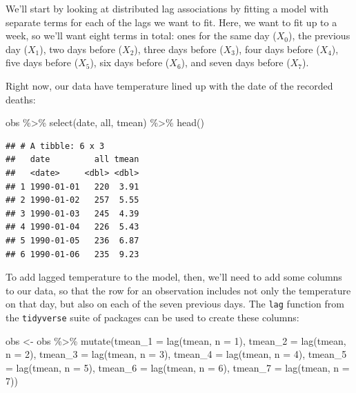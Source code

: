 \documentclass[
]{book}
\newenvironment{Shaded}{\begin{snugshade}}{\end{snugshade}}
\newcommand{\AttributeTok}[1]{\textcolor[rgb]{0.77,0.63,0.00}{#1}}
\newcommand{\DecValTok}[1]{\textcolor[rgb]{0.00,0.00,0.81}{#1}}
\newcommand{\FunctionTok}[1]{\textcolor[rgb]{0.00,0.00,0.00}{#1}}
\newcommand{\NormalTok}[1]{#1}
\newcommand{\OtherTok}[1]{\textcolor[rgb]{0.56,0.35,0.01}{#1}}
\newcommand{\SpecialCharTok}[1]{\textcolor[rgb]{0.00,0.00,0.00}{#1}}
\begin{document}
We'll start by looking at distributed lag associations by fitting a model with
separate terms for each of the lags we want to fit. Here, we want to fit up to
a week, so we'll want eight terms in total: ones for the same day (\(X_0\)), the
previous day (\(X_1\)), two days before (\(X_2\)), three days before (\(X_3\)),
four days before (\(X_4\)), five days before (\(X_5\)), six days before (\(X_6\)),
and seven days before (\(X_7\)).

Right now, our data have temperature lined up with the date of the recorded deaths:

\begin{Shaded}
\begin{Highlighting}[]
\NormalTok{obs }\SpecialCharTok{\%\textgreater{}\%} 
  \FunctionTok{select}\NormalTok{(date, all, tmean) }\SpecialCharTok{\%\textgreater{}\%} 
  \FunctionTok{head}\NormalTok{()}
\end{Highlighting}
\end{Shaded}

\begin{verbatim}
## # A tibble: 6 x 3
##   date         all tmean
##   <date>     <dbl> <dbl>
## 1 1990-01-01   220  3.91
## 2 1990-01-02   257  5.55
## 3 1990-01-03   245  4.39
## 4 1990-01-04   226  5.43
## 5 1990-01-05   236  6.87
## 6 1990-01-06   235  9.23
\end{verbatim}

To add lagged temperature to the model, then, we'll need to add some columns to our
data, so that the row for an observation includes not only the temperature on that
day, but also on each of the seven previous days. The \texttt{lag} function from the \texttt{tidyverse}
suite of packages can be used to create these columns:

\begin{Shaded}
\begin{Highlighting}[]
\NormalTok{obs }\OtherTok{\textless{}{-}}\NormalTok{ obs }\SpecialCharTok{\%\textgreater{}\%} 
  \FunctionTok{mutate}\NormalTok{(}\AttributeTok{tmean\_1 =} \FunctionTok{lag}\NormalTok{(tmean, }\AttributeTok{n =} \DecValTok{1}\NormalTok{), }
         \AttributeTok{tmean\_2 =} \FunctionTok{lag}\NormalTok{(tmean, }\AttributeTok{n =} \DecValTok{2}\NormalTok{), }
         \AttributeTok{tmean\_3 =} \FunctionTok{lag}\NormalTok{(tmean, }\AttributeTok{n =} \DecValTok{3}\NormalTok{), }
         \AttributeTok{tmean\_4 =} \FunctionTok{lag}\NormalTok{(tmean, }\AttributeTok{n =} \DecValTok{4}\NormalTok{), }
         \AttributeTok{tmean\_5 =} \FunctionTok{lag}\NormalTok{(tmean, }\AttributeTok{n =} \DecValTok{5}\NormalTok{), }
         \AttributeTok{tmean\_6 =} \FunctionTok{lag}\NormalTok{(tmean, }\AttributeTok{n =} \DecValTok{6}\NormalTok{), }
         \AttributeTok{tmean\_7 =} \FunctionTok{lag}\NormalTok{(tmean, }\AttributeTok{n =} \DecValTok{7}\NormalTok{))}
\end{Highlighting}
\end{Shaded}
\end{document}
